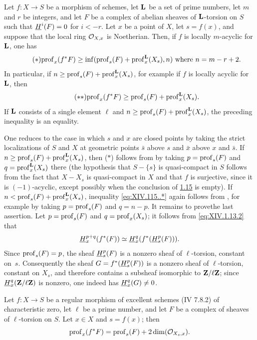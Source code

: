 \begin{corollaire} \label{XIV.1.15}
Let $f:X\to S$ be a morphism of schemes, let $\mathbf L$ be a set of prime numbers, let $m$ and $r$ be integers, and let $F$ be a complex of abelian sheaves of $\mathbf L$-torsion on $S$ such that $\mathop{\underline{H}}\nolimits^i(F)=0$ for $i<-r$. Let $x$ be a point of $X$, let $s=f(x)$, and suppose that the local ring $\mathcal O_{X,x}$ is Noetherian. Then, if $f$ is locally $m$-acyclic for $\mathbf L$, one has
\begin{equation*} \label{eq:XIV.115..*} \tag{$*$} {\operatorname{prof}_x(f^*F)\geq\inf(\operatorname{prof}_s(F)+\operatorname{prof}^\mathbf L_x(X_s), n)\text{ where }n=m-r+2.}
\end{equation*}
In particular, if $n\geq\operatorname{prof}_s(F)+\operatorname{prof}_x^\mathbf L(X_s)$, for example if $f$ is locally acyclic for $\mathbf L$, then
\begin{equation*} \label{eq:XIV.15.**} \tag{$**$} {\operatorname{prof}_x(f^*F)\geq\operatorname{prof}_s(F)+\operatorname{prof}_x^\mathbf L(X_s).}
\end{equation*}
If $\mathbf L$ consists of a single element $\ell$ and $n\geq \operatorname{prof}_s(F)+\operatorname{prof}_x^\mathbf L(X_s)$, the preceding inequality is an equality.
\end{corollaire}

One reduces to the case in which $s$ and $x$ are closed points by taking the strict localizations of $S$ and $X$ at geometric points $\bar s$ above $s$ and $\bar x$ above $x$ and $\bar s$. If $n\geq\operatorname{prof}_s(F)+\operatorname{prof}_x^\mathbf L(X_s)$, then ($*$) follows from  by taking $p=\operatorname{prof}_s(F)$ and $q=\operatorname{prof}_x^\mathbf L(X_s)$ there (the hypothesis that $S-\{s\}$ is quasi-compact in $S$ follows from the fact that $X-X_s$ is quasi-compact in $X$ and that $f$ is surjective, since it is $(-1)$-acyclic, except possibly when the conclusion of \hyperref[XIV.1.15]{1.15} is empty). If $n<\operatorname{prof}_s(F)+\operatorname{prof}_x^\mathbf L(X_s)$, inequality \eqref{eq:XIV.115..*} again follows from , for example by taking $p=\operatorname{prof}_s(F)$ and $q=n-p$. It remains to prove\pageoriginale the last assertion. Let $p=\operatorname{prof}_s(F)$ and $q=\operatorname{prof}_x(X_s)$; it follows from \eqref{eq:XIV.1.13.2} that
$$
\mathop{\underline{H}}\nolimits_x^{p+q}(f^*(F))\simeq \mathop{\underline{H}}\nolimits_x^q(f^*(\mathop{\underline{H}}\nolimits^p_s(F))).
$$
Since $\operatorname{prof}_s(F)=p$, the sheaf $\mathop{\underline{H}}\nolimits^p_s(F)$ is a nonzero sheaf of $\ell$-torsion, constant on~$s$. Consequently the sheaf $G=f^*(\mathop{\underline{H}}\nolimits_s^p(F))$ is a nonzero sheaf of $\ell$-torsion, constant on $X_s$, and therefore contains a subsheaf isomorphic to $\mathbf Z/\ell\mathbf Z$; since $\mathop{\underline{H}}\nolimits_x^q(\mathbf Z/\ell\mathbf Z)$ is nonzero, one indeed has $\mathop{\underline{H}}\nolimits_x^q(G)\neq 0$.

\begin{corollaire} \label{XIV.1.16}
Let $f:X\to S$ be a regular morphism of excellent schemes (\textup{\EGA IV 7.8.2}) of characteristic zero, let $\ell$ be a prime number, and let $F$ be a complex of sheaves of $\ell$-torsion on $S$. Let $x\in X$ and $s=f(x)$; then
$$
\operatorname{prof}_x(f^*F)=\operatorname{prof}_s(F)+2\dim(\mathcal O_{X_s,x}).
$$
\end{corollaire}

